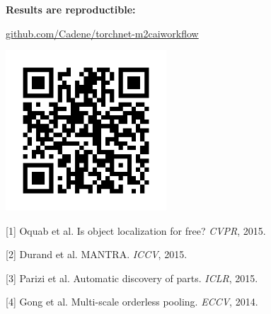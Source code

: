 \documentclass[landscape,a0paper,fontscale=0.292]{baposter}
\begin{document}
\begin{poster}
{\textbf{Results are reproductible:}

\url{github.com/Cadene/torchnet-m2caiworkflow}

\begin{center}
\includegraphics[width=6cm]{images/github.jpg}
\end{center}


{
\scriptsize
[1] Oquab et al. Is object localization for free? {\em CVPR}, 2015.

[2] Durand et al. MANTRA. {\em ICCV}, 2015.

[3] Parizi et al. Automatic discovery of parts. {\em ICLR}, 2015.

[4] Gong et al. Multi-scale orderless pooling. {\em ECCV}, 2014.

}

}

\end{poster}%
%
\end{document}
